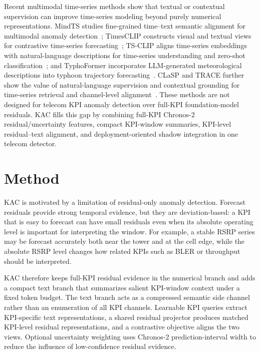 \documentclass[conference]{IEEEtran}
\begin{document}
Recent multimodal time-series methods show that textual or contextual supervision can improve time-series modeling beyond purely numerical representations. MindTS studies fine-grained time--text semantic alignment for multimodal anomaly detection~\cite{hu2026mindts}; TimesCLIP constructs visual and textual views for contrastive time-series forecasting~\cite{dong2025timesclip}; TS-CLIP aligns time-series embeddings with natural-language descriptions for time-series understanding and zero-shot classification~\cite{chen2025tsclip}; and TyphoFormer incorporates LLM-generated meteorological descriptions into typhoon trajectory forecasting~\cite{li2025typhoformer}. CLaSP and TRACE further show the value of natural-language supervision and contextual grounding for time-series retrieval and channel-level alignment~\cite{ito2024clasp,chen2025trace}. These methods are not designed for telecom KPI anomaly detection over full-KPI foundation-model residuals. KAC fills this gap by combining full-KPI Chronos-2 residual/uncertainty features, compact KPI-window summaries, KPI-level residual--text alignment, and deployment-oriented shadow integration in one telecom detector.

\section{Method}
\label{sec:method}

KAC is motivated by a limitation of residual-only anomaly detection.
Forecast residuals provide strong temporal evidence, but they are deviation-based: a KPI that is easy to forecast can have small residuals even when its absolute operating level is important for interpreting the window.
For example, a stable RSRP series may be forecast accurately both near the tower and at the cell edge, while the absolute RSRP level changes how related KPIs such as BLER or throughput should be interpreted.

KAC therefore keeps full-KPI residual evidence in the numerical branch and adds a compact text branch that summarizes salient KPI-window context under a fixed token budget.
The text branch acts as a compressed semantic side channel rather than an enumeration of all KPI channels.
Learnable KPI queries extract KPI-specific text representations, a shared residual projector produces matched KPI-level residual representations, and a contrastive objective aligns the two views.
Optional uncertainty weighting uses Chronos-2 prediction-interval width to reduce the influence of low-confidence residual evidence.
\end{document}
